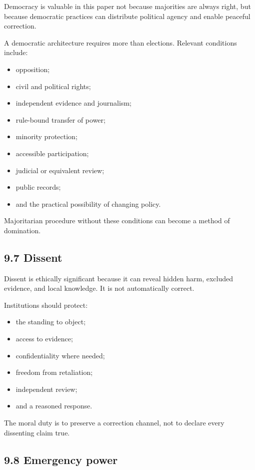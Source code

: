 \documentclass[
  11pt,
]{article}
\providecommand{\tightlist}{%
  \setlength{\itemsep}{0pt}\setlength{\parskip}{0pt}}
\begin{document}
Democracy is valuable in this paper not because majorities are always
right, but because democratic practices can distribute political agency
and enable peaceful correction.

A democratic architecture requires more than elections. Relevant
conditions include:

\begin{itemize}
\tightlist
\item
  opposition;
\item
  civil and political rights;
\item
  independent evidence and journalism;
\item
  rule-bound transfer of power;
\item
  minority protection;
\item
  accessible participation;
\item
  judicial or equivalent review;
\item
  public records;
\item
  and the practical possibility of changing policy.
\end{itemize}

Majoritarian procedure without these conditions can become a method of
domination.

\subsection{9.7 Dissent}\label{dissent}

Dissent is ethically significant because it can reveal hidden harm,
excluded evidence, and local knowledge. It is not automatically correct.

Institutions should protect:

\begin{itemize}
\tightlist
\item
  the standing to object;
\item
  access to evidence;
\item
  confidentiality where needed;
\item
  freedom from retaliation;
\item
  independent review;
\item
  and a reasoned response.
\end{itemize}

The moral duty is to preserve a correction channel, not to declare every
dissenting claim true.

\subsection{9.8 Emergency power}\label{emergency-power}
\end{document}
